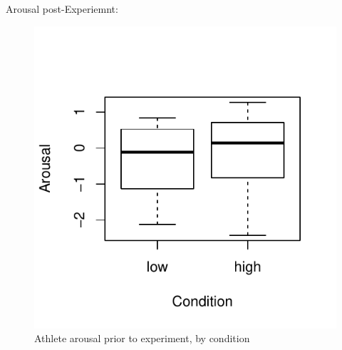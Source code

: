 

















Arousal post-Experiemnt:

\begin{figure}
  \centering
  \includegraphics[width=0.5\linewidth,keepaspectratio] {images/arousalFactorPreBoxPlot-1}
  \caption{Athlete arousal prior to experiment, by condition}
        \label{fig:arousalFactorPreBoxPlot}
    \end{figure}

